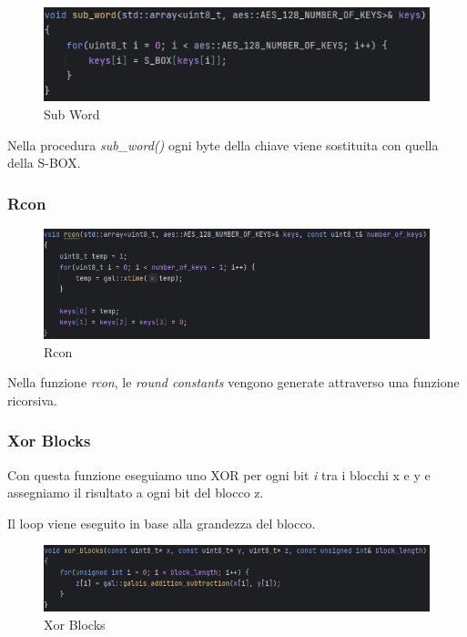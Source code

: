 \begin{figure}[H]
	\centering
	\includegraphics[width=1\textwidth, height=1\textheight, keepaspectratio]{./images/code/cpp/key_expansion/sub_word.PNG}
	\caption{Sub Word}
	\label{fig:sub_word}
\end{figure}

\textsf{\small Nella procedura \emph{sub\_word()} ogni byte della chiave viene sostituita con quella della S-BOX.} %

\subsubsection{Rcon}

\begin{figure}[H]
	\centering
	\includegraphics[width=1\textwidth, height=1\textheight, keepaspectratio]{./images/code/cpp/key_expansion/rcon.PNG}
	\caption{Rcon}
	\label{fig:rcon}
\end{figure}

\textsf{\small Nella funzione \emph{rcon}, le \emph{round constants} vengono generate attraverso una funzione ricorsiva.} %

\subsubsection{Xor Blocks} %

\textsf{\small Con questa funzione eseguiamo uno XOR per ogni bit \emph{i} tra i blocchi x e y e assegniamo il risultato a ogni bit del blocco z. }

\textsf{\small Il loop viene eseguito in base alla grandezza del blocco.}

\begin{figure}[H]
	\centering
	\includegraphics[width=1\textwidth, height=1\textheight, keepaspectratio]{./images/code/cpp/key_expansion/xor_blocks.PNG}
	\caption{Xor Blocks}
	\label{fig:xor_blocks}
\end{figure}

